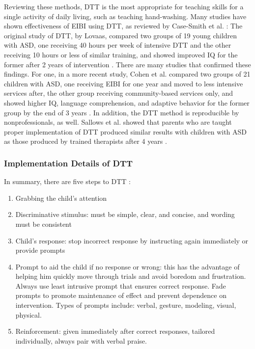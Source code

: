 Reviewing these methods, DTT is the most appropriate for teaching skills for a single activity of daily living, such as teaching hand-washing.  Many studies have shown effectiveness of EIBI using DTT, as reviewed by Case-Smith et al. \cite{case2008evidence}: The original study of DTT, by Lovaas, compared two groups of 19 young children with ASD, one receiving 40 hours per week of intensive DTT and the other receiving 10 hours or less of similar training, and showed improved IQ for the former after 2 years of intervention \cite{lovaas1987behavioral}.  There are many studies that confirmed these findings.  For one, in a more recent study, Cohen et al. compared two groups of 21 children with ASD, one receiving EIBI for one year and moved to less intensive services after, the other group receiving community-based services only, and showed higher IQ, language comprehension, and adaptive behavior for the former group by the end of 3 years \cite{cohen2006early}.  In addition, the DTT method is reproducible by nonprofessionals, as well.  Sallows et al. showed that parents who are taught proper implementation of DTT produced similar results with children with ASD as those produced by trained therapists after 4 years \cite{sallows2005intensive}.

\subsubsection{Implementation Details of DTT}
In summary, there are five steps to DTT \cite{bogin2010steps}:
\begin{enumerate}
	\item Grabbing the child's attention
	\item Discriminative stimulus: must be simple, clear, and concise, and wording must be consistent
	\item Child's response: stop incorrect response by instructing again immediately or provide prompts
	\item Prompt to aid the child if no response or wrong: this has the advantage of helping him quickly move through trials and avoid boredom and frustration.  Always use least intrusive prompt that ensures correct response.  Fade prompts to promote maintenance of effect and prevent dependence on intervention.  Types of prompts include: verbal, gesture, modeling, visual, physical.
	\item Reinforcement: given immediately after correct responses, tailored individually, always pair with verbal praise.
\end{enumerate}
